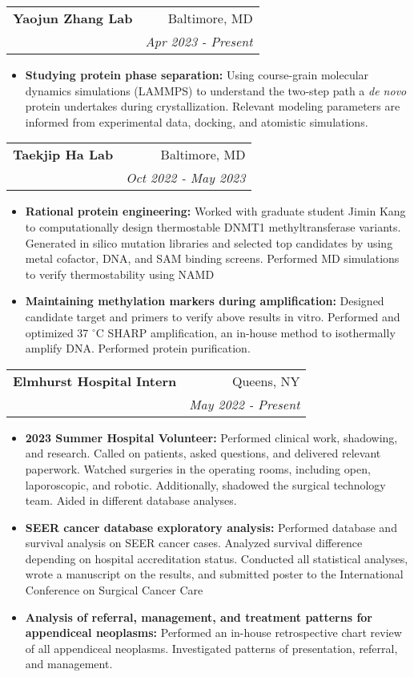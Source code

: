\documentclass[letterpaper,11pt]{article}
\makeatletter
\newcommand{\resumeItem}[2]{
  \item\small{
    \textbf{#1}{ #2 \vspace{-2pt}}
  }
}
\newcommand{\resumeSubheading}[4]{
  \vspace{-1pt}\item
    \begin{tabular*}{0.98\textwidth}[t]{l@{\extracolsep{\fill}}r}
      \textbf{#1} & #2 \\
      \makecell[l]{\textit{\small#3}} & \textit{\small #4} \\
    \end{tabular*}\vspace{-5pt}
}
\newcommand{\resumeItemListStart}{\begin{itemize}[rightmargin=\dimexpr\linewidth-0.75\textwidth-\leftmargin\relax]}
\newcommand{\resumeItemListEnd}{\end{itemize}\vspace{-5pt}}
\makeatother
\begin{document}
    \resumeSubheading
      {Yaojun Zhang Lab}{Baltimore, MD}
      {Student Researcher}{Apr 2023 - Present}
      \resumeItemListStart
        \resumeItem{Studying protein phase separation:}
          {Using course-grain molecular dynamics simulations (LAMMPS) to understand the two-step path a \textit{de novo} protein undertakes during crystallization. Relevant modeling parameters are informed from experimental data, docking, and atomistic simulations.}
      \resumeItemListEnd

    \resumeSubheading
      {Taekjip Ha Lab}{Baltimore, MD}
      {Student Researcher}{Oct 2022 - May 2023}
      \resumeItemListStart
        \resumeItem{Rational protein engineering:}
          {Worked with graduate student Jimin Kang to computationally design thermostable DNMT1 methyltransferase variants. Generated in silico mutation libraries and selected top candidates by using metal cofactor, DNA, and SAM binding screens. Performed MD simulations to verify thermostability using NAMD}
        \resumeItem{Maintaining methylation markers during amplification:}
          {Designed candidate target and primers to verify above results in vitro. Performed and optimized 37 $^\circ$C SHARP amplification, an in-house method to isothermally amplify DNA. Performed protein purification.}
        
      \resumeItemListEnd

    \resumeSubheading{Elmhurst Hospital Intern}{Queens, NY}{Student Researcher and Intern}{May 2022 - Present}
    \resumeItemListStart
      \resumeItem{2023 Summer Hospital Volunteer:}
        {Performed clinical work, shadowing, and research. Called on patients, asked questions, and delivered relevant paperwork. Watched surgeries in the operating rooms, including open, laporoscopic, and robotic. Additionally, shadowed the surgical technology team. Aided in different database analyses.}
      \resumeItem{SEER cancer database exploratory analysis:}
        {Performed database and survival analysis on SEER cancer cases. Analyzed survival difference depending on hospital accreditation status. Conducted all statistical analyses, wrote a manuscript on the results, and submitted poster to the International Conference on Surgical Cancer Care}
      \resumeItem{Analysis of referral, management, and treatment patterns for appendiceal neoplasms:}
        {Performed an in-house retrospective chart review of all appendiceal neoplasms. Investigated patterns of presentation, referral, and management.}
    \resumeItemListEnd
\end{document}
